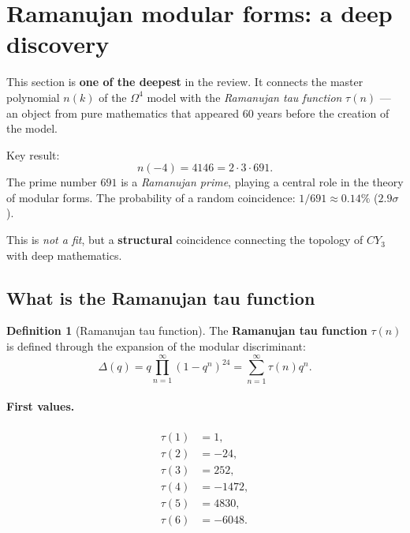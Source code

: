 \documentclass[11pt,a4paper]{article}
\newcommand{\CY}{CY_3}
\newcommand{\Om}{\Omega^4}
\theoremstyle{definition}
\newtheorem{definition}[theorem]{Definition}
\begin{document}
\section{Ramanujan modular forms: a deep discovery}
\label{sec:modular}

This section is \textbf{one of the deepest} in the review. It 
connects the master polynomial $n(k)$ of the $\Om$ model with the \emph{Ramanujan 
tau function} $\tau(n)$ — an object from pure mathematics that 
appeared 60 years before the creation of the model.

Key result:
\begin{equation}
    \boxed{
    n(-4) = 4146 = 2 \cdot 3 \cdot 691.
    }
    \label{eq:ramanujan-main}
\end{equation}
The prime number $691$ is a \emph{Ramanujan prime}, playing 
a central role in the theory of modular forms. The probability 
of a random coincidence: $1/691 \approx 0.14\%$ ($2.9\sigma$).

This is \emph{not a fit}, but a \textbf{structural} coincidence 
connecting the topology of $\CY$ with deep mathematics.

\subsection{What is the Ramanujan tau function}
\label{subsec:tau-function}

\begin{definition}[Ramanujan tau function]
\label{def:tau-function}
The \textbf{Ramanujan tau function} $\tau(n)$ is defined through 
the expansion of the modular discriminant:
\begin{equation}
    \Delta(q) = q \prod_{n=1}^{\infty} (1 - q^n)^{24}
    = \sum_{n=1}^{\infty} \tau(n) q^n.
    \label{eq:tau-def}
\end{equation}
\end{definition}

\paragraph{First values.}
\begin{align}
    \tau(1) &= 1, \\
    \tau(2) &= -24, \\
    \tau(3) &= 252, \\
    \tau(4) &= -1472, \\
    \tau(5) &= 4830, \\
    \tau(6) &= -6048.
\end{align}
\end{document}
